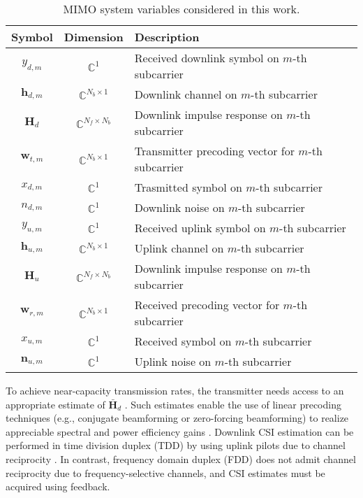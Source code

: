 \begin{table}[]
\centering
\caption{MIMO system variables considered in this work.}
\label{tab:mimo-params}
\begin{tabular}{c|c|l}
\toprule
\textbf{Symbol}   & \textbf{Dimension}            & \textbf{Description} \\ \midrule
$y_{d,m}$ 		  & $\mathbb{C}^{1}$ 			  & Received downlink symbol on $m$-th subcarrier  \\ \hline
$\mathbf h_{d,m}$ & $\mathbb{C}^{N_b \times 1}$   & Downlink channel on $m$-th subcarrier  \\ \hline
$\mathbf H_{d}$   & $\mathbb{C}^{N_f \times N_b}$ & Downlink impulse response on $m$-th subcarrier  \\ \hline
$\mathbf w_{t,m}$ & $\mathbb{C}^{N_b \times 1}$   & Transmitter precoding vector for $m$-th subcarrier  \\ \hline
$x_{d,m}$ 		  & $\mathbb{C}^{1}$ 			  & Trasmitted symbol on $m$-th subcarrier  \\ \hline
$n_{d,m}$ 		  & $\mathbb{C}^{1}$ 			  & Downlink noise on $m$-th subcarrier  \\ \hline
$y_{u,m}$ 		  & $\mathbb{C}^{1}$ 			  & Received uplink symbol on $m$-th subcarrier  \\ \hline
$\mathbf h_{u,m}$ & $\mathbb{C}^{N_b \times 1}$   & Uplink channel on $m$-th subcarrier  \\ \hline
$\mathbf H_{u}$   & $\mathbb{C}^{N_f \times N_b}$ & Downlink impulse response on $m$-th subcarrier  \\ \hline
$\mathbf w_{r,m}$ & $\mathbb{C}^{N_b \times 1}$   & Received precoding vector for $m$-th subcarrier  \\ \hline
$x_{u,m}$ 		  & $\mathbb{C}^{1}$ 			  & Received symbol on $m$-th subcarrier  \\ \hline
$\mathbf n_{u,m}$ & $\mathbb{C}^{1}$ 			  & Uplink noise on $m$-th subcarrier  \\ \hline
\end{tabular}
\end{table}
To achieve near-capacity transmission rates, the transmitter needs access to an appropriate estimate of $\bar{\mathbf H}_d$ \cite{ref:goldsmith2003capacity}. Such estimates enable the use of linear precoding techniques (e.g., conjugate beamforming or zero-forcing beamforming) to realize appreciable spectral and power efficiency gains \cite{ref:yang2013performance}. Downlink CSI estimation can be performed in time division duplex (TDD) by using uplink pilots due to channel reciprocity \cite{ref:Kaltenberger2010relative,ref:mi2017massive,ref:Gao2010utilization}. In contrast, frequency domain duplex (FDD) does not admit channel reciprocity due to frequency-selective channels, and CSI estimates must be acquired using feedback.

